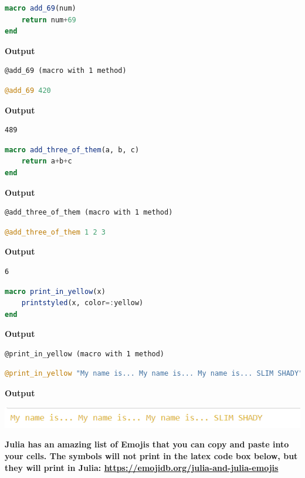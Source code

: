 \begin{lstlisting}[language=Julia,style=mystyle]
macro add_69(num)
    return num+69
end
\end{lstlisting}
\textbf{Output} 
\begin{verbatim}
@add_69 (macro with 1 method)
\end{verbatim}

\begin{lstlisting}[language=Julia,style=mystyle]
@add_69 420
\end{lstlisting}
\textbf{Output} 
\begin{verbatim}
489
\end{verbatim}


\begin{lstlisting}[language=Julia,style=mystyle]
macro add_three_of_them(a, b, c)
    return a+b+c
end
\end{lstlisting}
\textbf{Output} 
\begin{verbatim}
@add_three_of_them (macro with 1 method)
\end{verbatim}

\begin{lstlisting}[language=Julia,style=mystyle]
@add_three_of_them 1 2 3
\end{lstlisting}
\textbf{Output} 
\begin{verbatim}
6
\end{verbatim}

\begin{lstlisting}[language=Julia,style=mystyle]
macro print_in_yellow(x)
    printstyled(x, color=:yellow)
end
\end{lstlisting}
\textbf{Output} 
\begin{verbatim}
@print_in_yellow (macro with 1 method)
\end{verbatim}

\begin{lstlisting}[language=Julia,style=mystyle]
@print_in_yellow "My name is... My name is... My name is... SLIM SHADY"
\end{lstlisting}
\textbf{Output} 

\includegraphics[width=0.7\columnwidth]{graphics/Chap06/PrintInYellow.png}%

\textbf{Julia has an amazing list of Emojis that you can copy and paste into your cells. The symbols will not print in the latex code box below, but they will print in Julia: \url {https://emojidb.org/julia-and-julia-emojis}}

